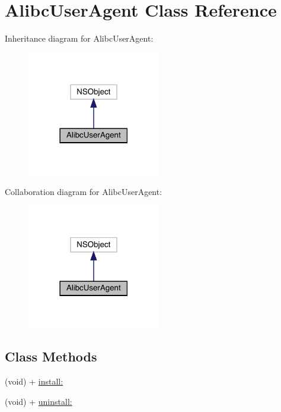 \hypertarget{interface_alibc_user_agent}{}\section{Alibc\+User\+Agent Class Reference}
\label{interface_alibc_user_agent}


Inheritance diagram for Alibc\+User\+Agent\+:\nopagebreak
\begin{figure}[H]
\begin{center}
\leavevmode
\includegraphics[width=165pt]{interface_alibc_user_agent__inherit__graph}
\end{center}
\end{figure}


Collaboration diagram for Alibc\+User\+Agent\+:\nopagebreak
\begin{figure}[H]
\begin{center}
\leavevmode
\includegraphics[width=165pt]{interface_alibc_user_agent__coll__graph}
\end{center}
\end{figure}
\subsection*{Class Methods}
\begin{DoxyCompactItemize}
\item 
(void) + \mbox{\hyperlink{interface_alibc_user_agent_a169435dc28b33336ccad1f2483f2bb91}{install\+:}}
\item 
(void) + \mbox{\hyperlink{interface_alibc_user_agent_a97408c5b7d051a854f5d83c14f492c47}{uninstall\+:}}
\end{DoxyCompactItemize}


